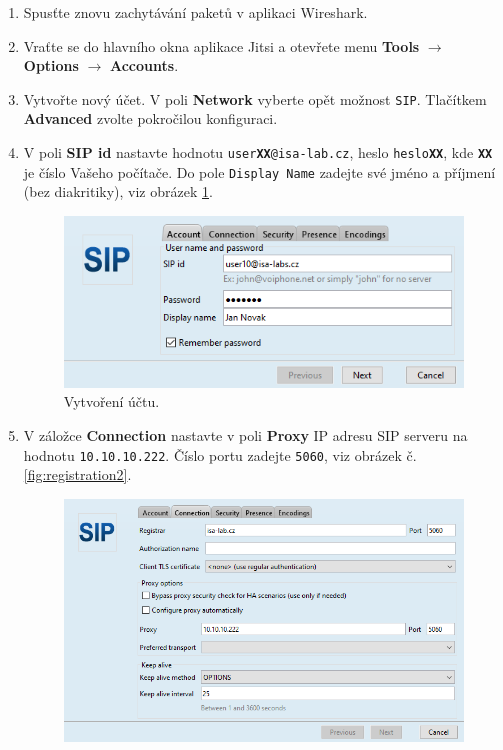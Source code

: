 \begin{enumerate}
    \item Spusťte znovu zachytávání paketů v aplikaci Wireshark.
    \item Vraťte se do hlavního okna aplikace Jitsi a otevřete menu {\bf Tools} $\rightarrow$ {\bf Options} $\rightarrow$ {\bf Accounts}.
    \item Vytvořte nový účet. V poli {\bf Network} vyberte opět možnost {\tt SIP}. Tlačítkem {\bf Advanced} zvolte pokročilou konfiguraci.
    \item V poli {\bf SIP id} nastavte hodnotu {\tt user{\bf XX}@isa-lab.cz}, heslo {\tt heslo{\bf XX}}, kde {\tt\bf XX} je číslo Vašeho počítače. Do pole {\tt Display Name} zadejte své jméno a příjmení (bez diakritiky), viz obrázek \ref{fig:registration1}.
      \begin{figure}[h!]
        \centering
        \includegraphics[scale=0.7]{img/jitsi-registration1c.png}
        \caption{Vytvoření účtu.}
        \label{fig:registration1}
      \end{figure}
    \item V záložce {\bf Connection} nastavte v poli {\bf Proxy} IP adresu SIP serveru na hodnotu {\tt 10.10.10.222}. Číslo portu zadejte {\tt 5060}, viz obrázek č. \ref{fig:registration2}. 
      \begin{figure}[h!]
        \centering
        \includegraphics[scale=0.7]{img/jitsi-registration2b.png}

\end{figure}
\end{enumerate}
